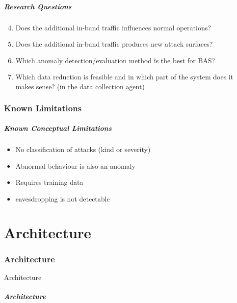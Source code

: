 \begin{frame}[c]
\frametitle{Research Questions}
	\begin{enumerate}
		\setcounter{enumi}{3}
		\item Does the additional in-band traffic influences normal operations?
		\item Does the additional in-band traffic produces new attack surfaces?
		\item Which anomaly detection/evaluation method îs the best for BAS?
		\item Which data reduction is feasible and in which part of the system does it makes sense? (in the data collection agent)
	\end{enumerate}
\end{frame}

\section{Known Limitations}
\begin{frame}[c]
	\frametitle{Known Conceptual Limitations}
	\begin{itemize}
		\item No classification of attacks (kind or severity)
		\item Abnormal behaviour is also an anomaly
		\item Requires training data
		\item eavesdropping is not detectable
	\end{itemize}
\end{frame}

\part{Architecture}
\label{part:architecture}

\section{Architecture}
\begin{frame}[c]
	\centering
	\LARGE Architecture
\end{frame}

\begin{frame}[c]
	\frametitle{Architecture}
	
	
	\note{
	}
\end{frame}

